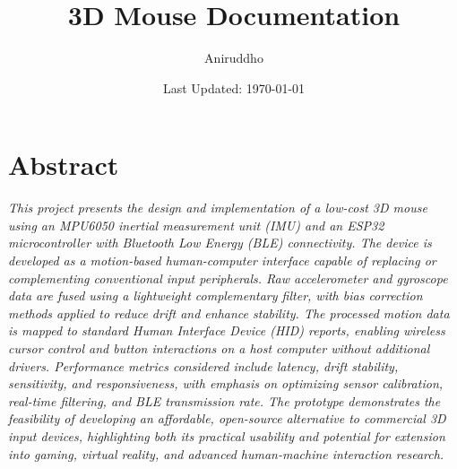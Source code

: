 \documentclass[10pt]{article}
\title{3D Mouse Documentation}
\author{Aniruddho}
\date{Last Updated: \today}
\begin{document}
\maketitle           %



\section*{Abstract} %

{\itshape This project presents the design and implementation of a low-cost 3D  
mouse using an MPU6050 inertial measurement unit (IMU) and an ESP32 microcontroller 
with Bluetooth Low Energy (BLE) connectivity. The device is developed as a motion-based 
human-computer interface capable of replacing or complementing conventional input 
peripherals. Raw accelerometer and gyroscope data are fused using a lightweight 
complementary filter, with bias correction methods applied to reduce drift and 
enhance stability. The processed motion data is mapped to standard Human Interface 
Device (HID) reports, enabling wireless cursor control and button interactions on 
a host computer without additional drivers. Performance metrics considered include 
latency, drift stability, sensitivity, and responsiveness, with emphasis on optimizing 
sensor calibration, real-time filtering, and BLE transmission rate. The prototype 
demonstrates the feasibility of developing an affordable, open-source alternative 
to commercial 3D input devices, highlighting both its practical usability and 
potential for extension into gaming, virtual reality, and advanced human-machine 
interaction research.}
\end{document}
